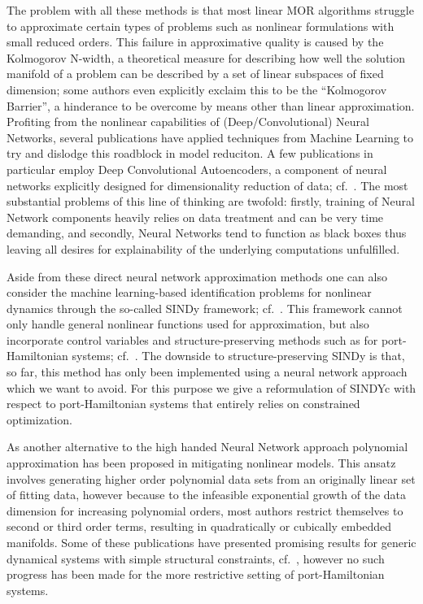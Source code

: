 The problem with all these methods is that most linear MOR algorithms struggle to approximate certain types of problems such as nonlinear formulations with small reduced orders.
This failure in approximative quality is caused by the Kolmogorov N-width, a theoretical measure for describing how well the solution manifold of a problem can be described by a set of linear subspaces of fixed dimension; some authors even explicitly exclaim this to be the ``Kolmogorov Barrier'', a hinderance to be overcome by means other than linear approximation.
Profiting from the nonlinear capabilities of (Deep/Convolutional) Neural Networks, several publications have applied techniques from Machine Learning to try and dislodge this roadblock in model reduciton.
A few publications in particular employ Deep Convolutional Autoencoders, a component of neural networks explicitly designed for dimensionality reduction of data; cf.~\cite{Lee2020, Benner2022, Romor2023, Buchfink2023}.
The most substantial problems of this line of thinking are twofold: firstly, training of Neural Network components heavily relies on data treatment and can be very time demanding, and secondly, Neural Networks tend to function as black boxes thus leaving all desires for explainability of the underlying computations unfulfilled.

Aside from these direct neural network approximation methods one can also consider the machine learning-based identification problems for nonlinear dynamics through the so-called SINDy framework; cf.~\cite{Brunton2016, Kaheman2020}.
This framework cannot only handle general nonlinear functions used for approximation, but also incorporate control variables and structure-preserving methods such as for port-Hamiltonian systems; cf.~\cite{Kaiser2018, Lee2022}.
The downside to structure-preserving SINDy is that, so far, this method has only been implemented using a neural network approach which we want to avoid.
For this purpose we give a reformulation of SINDYc with respect to port-Hamiltonian systems that entirely relies on constrained optimization.

As another alternative to the high handed Neural Network approach polynomial approximation has been proposed in mitigating nonlinear models.
This ansatz involves generating higher order polynomial data sets from an originally linear set of fitting data, however because to the infeasible exponential growth of the data dimension for increasing polynomial orders, most authors restrict themselves to second or third order terms, resulting in quadratically or cubically embedded manifolds.
Some of these publications have presented promising results for generic dynamical systems with simple structural constraints, cf.~\cite{Gu2011, Peherstorfer2016, Jain2017, Rutzmoser2017, Kramer2019, BGK2020, BGH2020, Qian2020, Gosea2021, Barnett2022, Khodabakhshi2022, Qian2022, Geelen2023}, however no such progress has been made for the more restrictive setting of port-Hamiltonian systems.

